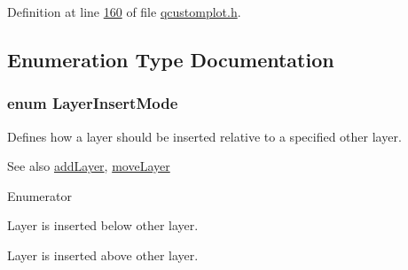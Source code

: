 Definition at line \hyperlink{a00116_source_l00160}{160} of file \hyperlink{a00116_source}{qcustomplot.\+h}.



\subsection{Enumeration Type Documentation}
\hypertarget{a00116_acf68ae22e9b44e959fc82bc6366e9b8d}{
\subsubsection[{Layer\+Insert\+Mode}]{\setlength{\rightskip}{0pt plus 5cm}enum {\bf Layer\+Insert\+Mode}\hspace{0.3cm}{\ttfamily [protected]}}}\label{a00116_acf68ae22e9b44e959fc82bc6366e9b8d}


Defines how a layer should be inserted relative to a specified other layer. 

\begin{DoxySeeAlso}{See also}
\hyperlink{a00116_acfae623ec58e4f9e35014062580e4720}{add\+Layer}, \hyperlink{a00116_ad18d1ff9086f2e658b81d67d3c84a0c3}{move\+Layer} 
\end{DoxySeeAlso}
\begin{Desc}
\item[Enumerator]\par
\begin{description}
\item[{\em 
\hypertarget{a00116_acf68ae22e9b44e959fc82bc6366e9b8da571c876f0344c894acf3e70b5e1281b7}{lim\+Below}\label{a00116_acf68ae22e9b44e959fc82bc6366e9b8da571c876f0344c894acf3e70b5e1281b7}
}]Layer is inserted below other layer. \item[{\em 
\hypertarget{a00116_acf68ae22e9b44e959fc82bc6366e9b8da065748f172d5a34ffd1e09924d55cc17}{lim\+Above}\label{a00116_acf68ae22e9b44e959fc82bc6366e9b8da065748f172d5a34ffd1e09924d55cc17}
}]Layer is inserted above other layer. \end{description}
\end{Desc}


